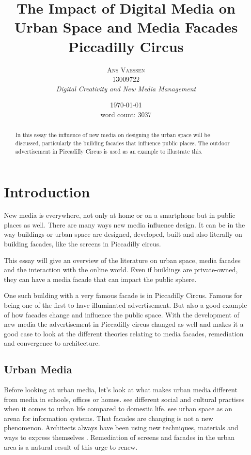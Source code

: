 \documentclass[a4paper, 11pt]{article}
\title{\textbf{The Impact of Digital Media on Urban Space and Media Facades}\\Piccadilly Circus}
\author{\textsc{Ans Vaessen}
\\13009722
\\{\textit{Digital Creativity and New Media Management}}}
\date{\today\\
word count: 3037}
\begin{document}
\maketitle

\begin{abstract}
In this essay the influence of new media on designing the urban space will be discussed, particularly the building facades that influence public places. The outdoor advertisement in Piccadilly Circus is used as an example to illustrate this.
\end{abstract}



\vspace{30pt} %

\section*{Introduction}



New media is everywhere, not only at home or on a smartphone but in public places as well. There are many ways new media influence design. It can be in the way buildings or urban space are designed, developed, built and also literally on building facades, like the screens in Piccadilly circus.

This essay will give an overview of the literature on urban space, media facades and the interaction with the online world. Even if buildings are private-owned, they can have a media facade that can impact the public sphere.

One such building with a very famous facade is in Piccadilly Circus. Famous for being one of the first to have illuminated advertisement. But also a good example of how facades change and influence the public space. With the development of new media the advertisement in Piccadilly circus changed as well and makes it a good case to look at the different theories relating to media facades, remediation and convergence to architecture.

\subsection{Urban Media} 
Before looking at urban media, let's look at what makes urban media different from media in schools, offices or homes. \cite{fritsch2008a} see different social and cultural practises when it comes to urban life compared to domestic life. \cite{Daalsgaard2010} see urban space as an arena for information systems.
That facades are changing is not a new phenomenon. Architects always have been using new techniques, materials and ways to express themselves \citep{fritsch2008a}. Remediation of screens and facades in the urban area is a natural result of this urge to renew. 
\end{document}
